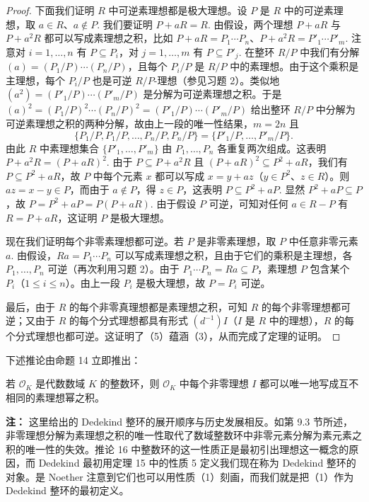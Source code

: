 \begin{proof}
下面我们证明 \(R\) 中可逆素理想都是极大理想。设 \(P\) 是 \(R\) 中的可逆素理想，取 \(a \in R\)、\(a \notin P\). 我们要证明 \(P+aR = R\). 由假设，两个理想 \(P+aR\) 与 \(P+a^2R\) 都可以写成素理想之积，比如 \(P+aR = P_1\cdots P_n\)、\(P+a^2R = P'_1\cdots P'_m\). 注意对 \(i = 1, \ldots, n\) 有 \(P \subseteq P_i\)，对 \(j = 1, \ldots, m\) 有 \(P \subseteq P'_j\). 在整环 \(R/P\) 中我们有分解 \((a) = (P_1/P)\cdots(P_n/P)\)，且每个 \(P_i/P\) 是 \(R/P\) 中的素理想。由于这个乘积是主理想，每个 \(P_i/P\) 也是可逆 \(R/P\)-理想（参见习题 2）。类似地 \((a^2) = (P'_1/P)\cdots(P'_m/P)\) 是分解为可逆素理想之积。于是 \((a)^2 = (P_1/P)^2\cdots(P_n/P)^2 = (P'_1/P)\cdots(P'_m/P)\) 给出整环 \(R/P\) 中分解为可逆素理想之积的两种分解，故由上一段的唯一性结果，\(m = 2n\) 且
\[
\{P_1/P, P_1/P, \ldots, P_n/P, P_n/P\} = \{P'_1/P, \ldots, P'_m/P\}.
\]
由此 \(R\) 中素理想集合 \(\{P'_1, \ldots, P'_m\}\) 由 \(P_1, \ldots, P_n\) 各重复两次组成。这表明 \(P+a^2R = (P+aR)^2\). 由于 \(P \subseteq P+a^2R\) 且 \((P+aR)^2 \subseteq P^2+aR\)，我们有 \(P \subseteq P^2+aR\)，故 \(P\) 中每个元素 \(x\) 都可以写成 \(x = y+az\)（\(y \in P^2\)、\(z \in R\)）。则 \(az = x-y \in P\)，而由于 \(a \notin P\)，得 \(z \in P\)，这表明 \(P \subseteq P^2+aP\). 显然 \(P^2+aP \subseteq P\)，故 \(P = P^2+aP = P(P+aR)\). 由于假设 \(P\) 可逆，可知对任何 \(a \in R-P\) 有 \(R = P+aR\)，这证明 \(P\) 是极大理想。

现在我们证明每个非零素理想都可逆。若 \(P\) 是非零素理想，取 \(P\) 中任意非零元素 \(a\). 由假设，\(Ra = P_1\cdots P_n\) 可以写成素理想之积，且由于它们的乘积是主理想，各 \(P_1, \ldots, P_n\) 可逆（再次利用习题 2）。由于 \(P_1\cdots P_n = Ra \subseteq P\)，素理想 \(P\) 包含某个 \(P_i\)（\(1 \leq i \leq n\)）。由上一段 \(P_i\) 是极大理想，故 \(P = P_i\) 可逆。

最后，由于 \(R\) 的每个非零真理想都是素理想之积，可知 \(R\) 的每个非零理想都可逆；又由于 \(R\) 的每个分式理想都具有形式 \((d^{-1})I\)（\(I\) 是 \(R\) 中的理想），\(R\) 的每个分式理想也都可逆。这证明了（5）蕴涵（3），从而完成了定理的证明。
\end{proof}

下述推论由命题 14 立即推出：

\begin{corollary}\label{cor:16.16}
若 \(\mathcal{O}_K\) 是代数数域 \(K\) 的整数环，则 \(\mathcal{O}_K\) 中每个非零理想 \(I\) 都可以唯一地写成互不相同的素理想幂之积。
\end{corollary}

\noindent\textbf{注：} 这里给出的 Dedekind 整环的展开顺序与历史发展相反。如第 9.3 节所述，非零理想分解为素理想之积的唯一性取代了数域整数环中非零元素分解为素元素之积的唯一性的失效。推论 16 中整数环的这一性质正是最初引出理想这一概念的原因，而 Dedekind 最初用定理 15 中的性质 5 定义我们现在称为 Dedekind 整环的对象。是 Noether 注意到它们也可以用性质（1）刻画，而我们就是把（1）作为 Dedekind 整环的最初定义。

